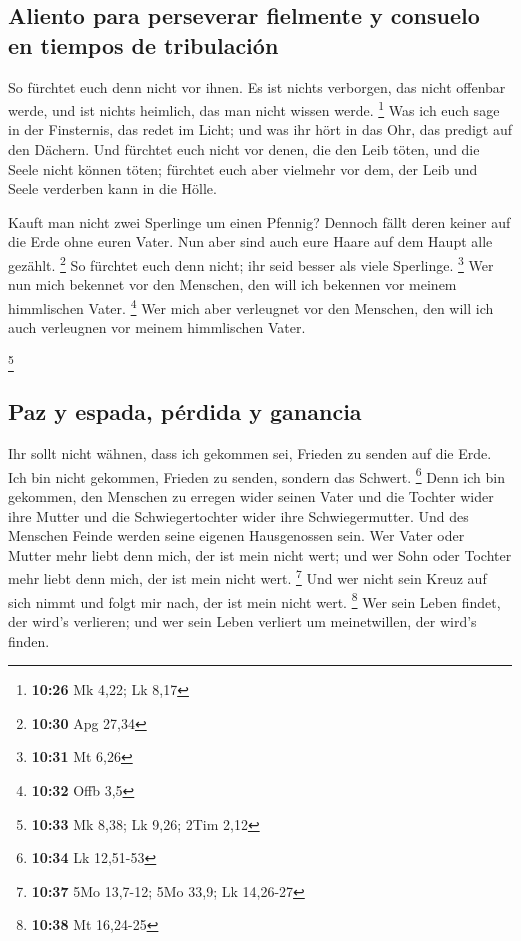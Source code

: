 \hypertarget{aliento-para-perseverar-fielmente-y-consuelo-en-tiempos-de-tribulaciuxf3n}{%
\subsection{Aliento para perseverar fielmente y consuelo en tiempos de
tribulación}\label{aliento-para-perseverar-fielmente-y-consuelo-en-tiempos-de-tribulaciuxf3n}}

 So fürchtet euch denn nicht vor ihnen. Es ist nichts
verborgen, das nicht offenbar werde, und ist nichts heimlich, das man
nicht wissen werde. \footnote{\textbf{10:26} Mk 4,22; Lk 8,17}
 Was ich euch sage in der Finsternis, das redet im Licht;
und was ihr hört in das Ohr, das predigt auf den Dächern.
 Und fürchtet euch nicht vor denen, die den Leib töten,
und die Seele nicht können töten; fürchtet euch aber vielmehr vor dem,
der Leib und Seele verderben kann in die Hölle.

 Kauft man nicht zwei Sperlinge um einen Pfennig? Dennoch
fällt deren keiner auf die Erde ohne euren Vater.  Nun
aber sind auch eure Haare auf dem Haupt alle gezählt. \footnote{\textbf{10:30}
  Apg 27,34}  So fürchtet euch denn nicht; ihr seid
besser als viele Sperlinge. \footnote{\textbf{10:31} Mt 6,26}
 Wer nun mich bekennet vor den Menschen, den will ich
bekennen vor meinem himmlischen Vater. \footnote{\textbf{10:32} Offb 3,5}
 Wer mich aber verleugnet vor den Menschen, den will ich
auch verleugnen vor meinem himmlischen Vater.

\footnote{\textbf{10:33} Mk 8,38; Lk 9,26; 2Tim 2,12}

\hypertarget{paz-y-espada-puxe9rdida-y-ganancia}{%
\subsection{Paz y espada, pérdida y
ganancia}\label{paz-y-espada-puxe9rdida-y-ganancia}}

 Ihr sollt nicht wähnen, dass ich gekommen sei, Frieden
zu senden auf die Erde. Ich bin nicht gekommen, Frieden zu senden,
sondern das Schwert. \footnote{\textbf{10:34} Lk 12,51-53}
 Denn ich bin gekommen, den Menschen zu erregen wider
seinen Vater und die Tochter wider ihre Mutter und die Schwiegertochter
wider ihre Schwiegermutter.  Und des Menschen Feinde
werden seine eigenen Hausgenossen sein.  Wer Vater oder
Mutter mehr liebt denn mich, der ist mein nicht wert; und wer Sohn oder
Tochter mehr liebt denn mich, der ist mein nicht wert. \footnote{\textbf{10:37}
  5Mo 13,7-12; 5Mo 33,9; Lk 14,26-27}  Und wer nicht sein
Kreuz auf sich nimmt und folgt mir nach, der ist mein nicht wert.
\footnote{\textbf{10:38} Mt 16,24-25}  Wer sein Leben
findet, der wird's verlieren; und wer sein Leben verliert um
meinetwillen, der wird's finden.

